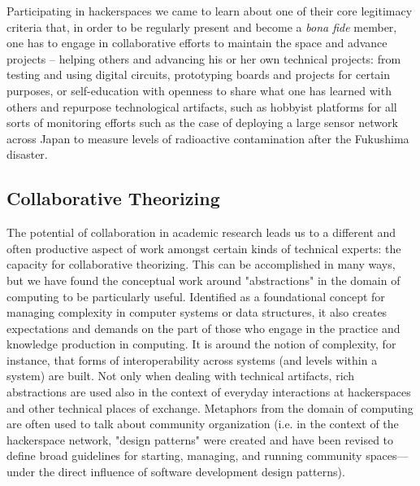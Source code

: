 \documentclass[10pt,letter,oneside]{scrartcl}
\begin{document}
Participating in hackerspaces we came to learn about one of their
core legitimacy criteria that, in order to be regularly present and
become a \emph{bona fide} member, one has to engage in collaborative
efforts to maintain the space and advance projects -- helping others
and advancing his or her own technical projects: from testing and
using digital circuits, prototyping boards and projects for certain
purposes, or self-education with openness to share what one has
learned with others and repurpose technological artifacts, such as
hobbyist platforms for all sorts of monitoring efforts such as the
case of deploying a large sensor network across Japan to measure
levels of radioactive contamination after the Fukushima
disaster.


\subsection{Collaborative Theorizing} 

The potential of collaboration in academic research leads us to a 
different and often productive aspect of work amongst certain kinds 
of technical experts: the capacity for collaborative theorizing.  
This can be accomplished in many ways, but we have found the 
conceptual work around "abstractions" in the domain of computing to
be particularly useful. Identified as a foundational concept for 
managing complexity in computer systems or data structures, it 
also creates expectations and demands on the part 
of those who engage in the practice and knowledge production in 
computing. It is around the notion of complexity, for instance,
that forms of interoperability across systems (and levels within
a system) are built. Not only when dealing with technical artifacts,
rich abstractions are used also in the context of everyday interactions
at hackerspaces and other technical places of exchange. Metaphors from
the domain of computing are often used to talk about community 
organization (i.e. in the context of the hackerspace network, "design
patterns" were created and have been revised to define broad guidelines
for starting, managing, and running community spaces---under the 
direct influence of software development design patterns).
    
%
   
\end{document}
